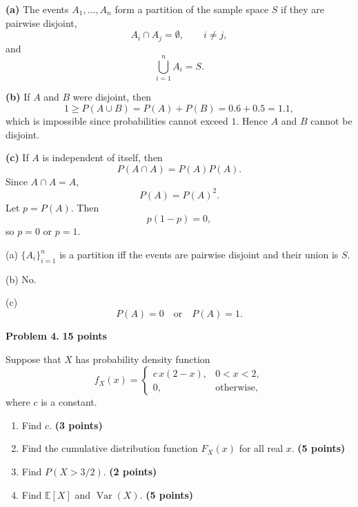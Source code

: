 \documentclass[11pt]{article}
\begin{document}
\begin{solutionbox}

\textbf{(a)} The events $A_1,\ldots,A_n$ form a partition of the sample space $S$ if they are pairwise disjoint,
\[
A_i\cap A_j=\emptyset,\qquad i\neq j,
\]
and
\[
\bigcup_{i=1}^n A_i=S.
\]

\textbf{(b)} If $A$ and $B$ were disjoint, then
\[
1\geq P(A\cup B)=P(A)+P(B)=0.6+0.5=1.1,
\]
which is impossible since probabilities cannot exceed $1$. Hence $A$ and $B$ cannot be disjoint.

\textbf{(c)} If $A$ is independent of itself, then
\[
P(A\cap A)=P(A)P(A).
\]
Since $A\cap A=A$,
\[
P(A)=P(A)^2.
\]
Let $p=P(A)$. Then
\[
p(1-p)=0,
\]
so $p=0$ or $p=1$.

\begin{finalanswerbox}
(a) $\{A_i\}_{i=1}^n$ is a partition iff the events are pairwise disjoint and their union is $S$.

(b) No.

(c)
\[
 {P(A)=0\quad\text{or}\quad P(A)=1.}
\]
\end{finalanswerbox}
\end{solutionbox}
\newpage
\begin{problemheader}
\textbf{Problem 4. } \hfill \textbf{15 points}
\end{problemheader}

Suppose that $X$ has probability density function
\[
f_X(x)=
\begin{cases}
 c\,x(2-x), & 0<x<2,\\
 0, & \text{otherwise},
\end{cases}
\]
where $c$ is a constant.

\begin{enumerate}[label=(\alph*),leftmargin=*,itemsep=0.7em]
    \item Find $c$. \hfill \textbf{(3 points)}
    \item Find the cumulative distribution function $F_X(x)$ for all real $x$. \hfill \textbf{(5 points)}
    \item Find $P(X>3/2)$. \hfill \textbf{(2 points)}
    \item Find $\mathbb{E}[X]$ and $\operatorname{Var}(X)$. \hfill \textbf{(5 points)}
\end{enumerate}
\end{document}
